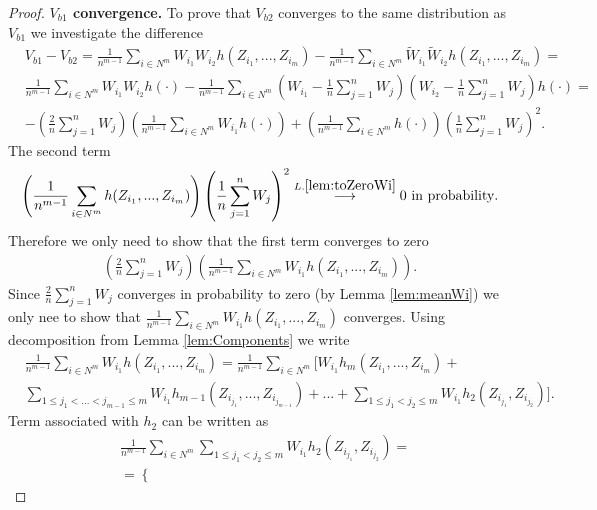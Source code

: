 \documentclass{article} %
\begin{document}
\begin{proof}
\textbf{$V_{b1}$ convergence.} To prove that  $V_{b2}$ converges to the same distribution as $V_{b1}$ we investigate the difference
\begin{align}
&V_{b1} - V_{b2} = \frac{1} {n^{m-1}} \sum_{i \in N^m} W_{i_1}W_{i_2} h(Z_{i_1},...,Z_{i_m}) - \frac{1} {n^{m-1}} \sum_{i \in N^m} \tilde W_{i_1} \tilde W_{i_2} h(Z_{i_1},...,Z_{i_m}) = \\
&\frac{1} {n^{m-1}} \sum_{i \in N^m} W_{i_1}W_{i_2} h(\cdot) - \frac{1} {n^{m-1}} \sum_{i \in N^m}  (W_{i_1} -\frac 1 n \sum_{j=1}^n W_j ) (W_{i_2} -\frac 1 n \sum_{j=1}^n W_j ) h(\cdot) = \\
&-\left(\frac 2 n \sum_{j=1}^n W_j \right) \left( \frac{1} {n^{m-1}} \sum_{i \in N^{m}} W_{i_1} h(\cdot) \right)  + \left(\frac{1} {n^{m-1}} \sum_{i \in N^{m}}  h(\cdot) \right) \left(\frac 1 n \sum_{j=1}^n W_j \right)^2.
\end{align} 
The second term
\begin{align}
\left(\frac{1} {n^{m-1}} \sum_{i \in N^{m}}  h(Z_{i_1},...,Z_{i_m}) \right) \left(\frac 1 n \sum_{j=1}^n W_j \right)^2 \overset{L. \ref{lem:toZeroWi}}{\longrightarrow} 0 \text{ in probability}.
\end{align}
Therefore we only need to show that the first term converges to zero
\begin{align}
\label{eq:firstTerm}
\left(\frac 2 n \sum_{j=1}^n W_j \right) \left( \frac{1} {n^{m-1}} \sum_{i \in N^{m}} W_{i_1} h(Z_{i_1},...,Z_{i_m}) \right).
\end{align}
Since $\frac 2 n \sum_{j=1}^n W_j$ converges in probability to zero (by Lemma \ref{lem:meanWi}) we only nee to show that $\frac{1} {n^{m-1}} \sum_{i \in N^{m}} W_{i_1} h(Z_{i_1},...,Z_{i_m})$ converges. Using decomposition from Lemma \ref{lem:Components} we write
\begin{align}
\label{eq:xyz}
&\frac{1} {n^{m-1}} \sum_{i \in N^{m}} W_{i_1} h(Z_{i_1},...,Z_{i_m}) =\frac{1} {n^{m-1}}  \sum_{i \in N^m}  \Big[ W_{i_1}    h_m(Z_{i_1},...,Z_{i_m})  + \\ 
 & \sum_{1 \leq j_1 < ...<j_{m-1} \leq m } W_{i_1}  h_{m-1}(Z_{i_{j_1}},...,Z_{i_{j_{m-1}}})   + ... + \sum_{1 \leq j_1 < j_2 \leq m } W_{i_1}  h_2(Z_{i_{j_1}},Z_{i_{j_2}}) \Big].
\end{align}
Term associated with $h_2$ can be written as
\begin{align}
&\frac{1} {n^{m-1}} \sum_{i \in N^{m}} \sum_{1 \leq j_1 < j_2 \leq m } W_{i_1}  h_2(Z_{i_{j_1}},Z_{i_{j_2}}) = \\
&= \left\{
 \begin{array}{lr}

\end{array}
\end{align}
\end{proof}
\end{document}
